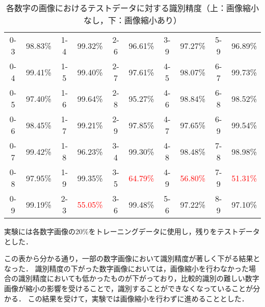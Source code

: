 \begin{table}[H]
\begin{center}
\begin{tabular}{|c|c||c|c||c|c||c|c||c|c|}
            0-3 & 98.83\% & 1-4 & 99.32\% & 2-6 & 96.61\% & 3-9 & 97.27\% & 5-9 & 96.89\%\\
            0-4 & 99.41\% & 1-5 & 99.40\% & 2-7 & 97.61\% & 4-5 & 98.07\% & 6-7 & 99.73\%\\
            0-5 & 97.40\% & 1-6 & 99.64\% & 2-8 & 95.27\% & 4-6 & 98.84\% & 6-8 & 98.52\%\\
            0-6 & 98.45\% & 1-7 & 99.21\% & 2-9 & 97.85\% & 4-7 & 97.65\% & 6-9 & 99.54\%\\
            0-7 & 99.42\% & 1-8 & 96.23\% & 3-4 & 99.30\% & 4-8 & 98.48\% & 7-8 & 98.98\%\\
            0-8 & 97.95\% & 1-9 & 99.35\% & 3-5 & \textcolor{red}{64.79\%} & 4-9 & \textcolor{red}{56.80\%} & 7-9 & \textcolor{red}{51.31\%}\\
            0-9 & 99.19\% & 2-3 & \textcolor{red}{55.05\%} & 3-6 & 99.48\% & 5-6 & 97.22\% & 8-9 & 97.10\%\\
            \hline
        \end{tabular}
    \end{center}
    \caption{各数字の画像におけるテストデータに対する識別精度（上：画像縮小なし，下：画像縮小あり）}
\end{table}
実験には各数字画像の20\%をトレーニングデータに使用し，残りをテストデータとした．\par
この表から分かる通り，一部の数字画像において識別精度が著しく下がる結果となった．
識別精度の下がった数字画像においては，画像縮小を行わなかった場合の識別精度においても低かったものが下がっており，比較的識別の難しい数字画像が縮小の影響を受けることで，識別することができなくなっていることが分かる．
この結果を受けて，実験では画像縮小を行わずに進めることとした．

